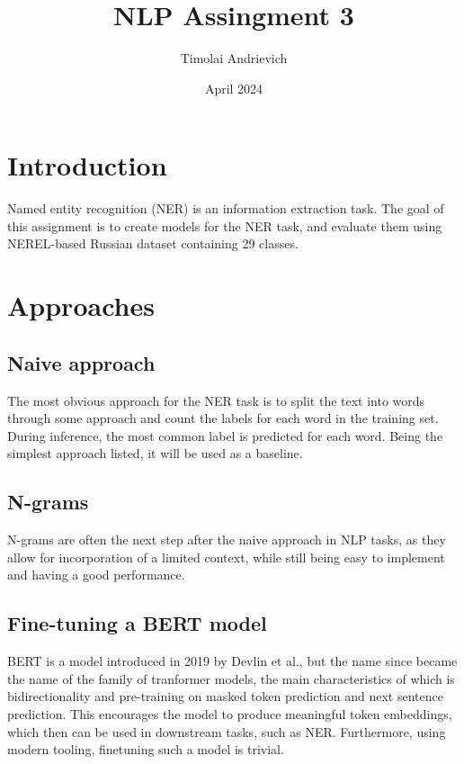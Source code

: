\documentclass{article}
\title{NLP Assingment 3}
\author{Timolai Andrievich}
\date{April 2024}
\begin{document}
\maketitle

\section{Introduction}

Named entity recognition (NER) is an information extraction task. The goal of 
this assignment is to create models for the NER task, and evaluate them using
NEREL-based Russian dataset containing 29 classes.

\section{Approaches}

\subsection{Naive approach}

The most obvious approach for the NER task is to split the text into words
through some approach and count the labels for each word in the training set.
During inference, the most common label is predicted for each word. Being the
simplest approach listed, it will be used as a baseline.

\subsection{N-grams}

N-grams are often the next step after the naive approach in NLP tasks, as they
allow for incorporation of a limited context, while still being easy to 
implement and having a good performance.

\subsection{Fine-tuning a BERT model}

BERT \cite{devlin2019bert} is a model introduced in 2019 by Devlin et al., but
the name since became the name of the family of tranformer models, the main
characteristics of which is bidirectionality and pre-training on masked
token prediction and next sentence prediction. This encourages the model to
produce meaningful token embeddings, which then can be used in downstream
tasks, such as NER. Furthermore, using modern tooling, finetuning such a model
is trivial.
\end{document}
